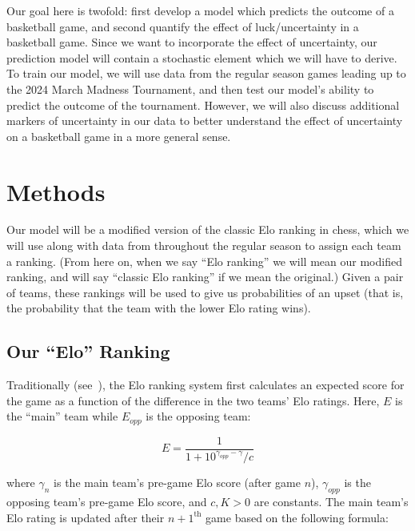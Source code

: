 \documentclass{article}
\begin{document}
Our goal here is twofold: first develop a model which predicts the outcome of a basketball game, and second quantify the effect of luck/uncertainty in a basketball game. Since we want to incorporate the effect of uncertainty, our prediction model will contain a stochastic element which we will have to derive. To train our model, we will use data from the regular season games leading up to the 2024 March Madness Tournament, and then test our model's ability to predict the outcome of the tournament. However, we will also discuss additional markers of uncertainty in our data to better understand the effect of uncertainty on a basketball game in a more general sense. 


\section{Methods}

Our model will be a modified version of the classic Elo ranking in chess, which we will use along with data from throughout the regular season to assign each team a ranking. (From here on, when we say ``Elo ranking'' we will mean our modified ranking, and will say ``classic Elo ranking'' if we mean the original.) Given a pair of teams, these rankings will be used to give us probabilities of an upset (that is, the probability that the team with the lower Elo rating wins). 


\subsection{Our ``Elo'' Ranking}
Traditionally (see~\cite{mediumRatingSystem}), the Elo ranking system first calculates an expected score for the game as a function of the difference in the two teams' Elo ratings. Here, $E$ is the ``main'' team while $E_{opp}$ is the opposing team:

\[
E = \frac{1}{1+10^{\gamma_{opp}-\gamma}/c}
\]

where $\gamma_n$ is the main team's pre-game Elo score (after game $n$), $\gamma_{opp}$ is the opposing team's pre-game Elo score, and $c, K > 0$ are constants. The main team's Elo rating is updated after their $n+1^{\text{th}}$ game based on the following formula:
\end{document}
